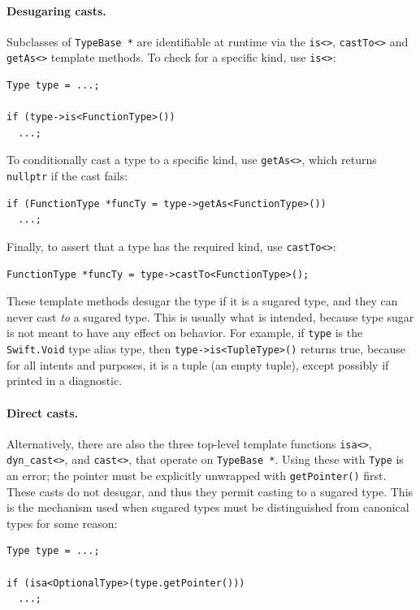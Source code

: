 \documentclass[../generics]{subfiles}
\begin{document}
\paragraph{Desugaring casts.}
Subclasses of \texttt{TypeBase *} are identifiable at runtime via the \verb|is<>|, \verb|castTo<>| and \verb|getAs<>| template methods.
To check for a specific kind, use \verb|is<>|:
\begin{Verbatim}
Type type = ...;

if (type->is<FunctionType>())
  ...;
\end{Verbatim}
To conditionally cast a type to a specific kind, use \verb|getAs<>|, which returns \verb|nullptr| if the cast fails:
\begin{Verbatim}
if (FunctionType *funcTy = type->getAs<FunctionType>())
  ...;
\end{Verbatim}
Finally, to assert that a type has the required kind, use \verb|castTo<>|:
\begin{Verbatim}
FunctionType *funcTy = type->castTo<FunctionType>();
\end{Verbatim}
These template methods desugar the type if it is a sugared type, and they can never cast \emph{to} a sugared type. This is usually what is intended, because type sugar is not meant to have any effect on behavior. For example, if \texttt{type} is the \texttt{Swift.Void} type alias type, then \texttt{type->is<TupleType>()} returns true, because for all intents and purposes, it is a tuple (an empty tuple), except possibly if printed in a diagnostic.

\paragraph{Direct casts.}
Alternatively, there are also the three top-level template functions \verb|isa<>|, \verb|dyn_cast<>|, and \verb|cast<>|, that operate on \texttt{TypeBase *}. Using these with \texttt{Type} is an error; the pointer must be explicitly unwrapped with \texttt{getPointer()} first. These casts do not desugar, and thus they permit casting to a sugared type. This is the mechanism used when sugared types must be distinguished from canonical types for some reason:
\begin{Verbatim}
Type type = ...;

if (isa<OptionalType>(type.getPointer()))
  ...;
\end{Verbatim}
\end{document}
